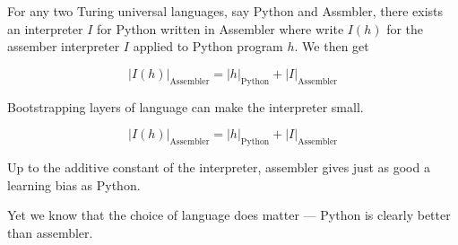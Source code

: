 {\vfill
For any two Turing universal languages, say Python and Assmbler, there exists an interpreter $I$ for Python written in Assembler
where write $I(h)$ for the assember interpreter $I$ applied to Python program $h$.  We then get

$$|I(h)|_\mathrm{Assembler} = |h|_\mathrm{Python} + |I|_\mathrm{Assembler}$$

\vfill
Bootstrapping layers of language can make the interpreter small.



$$|I(h)|_\mathrm{Assembler} = |h|_\mathrm{Python} + |I|_\mathrm{Assembler}$$

\vfill
Up to the additive constant of the interpreter, assembler gives just as good a learning bias as Python.

\vfill
Yet we know that the choice of language does matter --- Python is clearly better than assembler.



}

